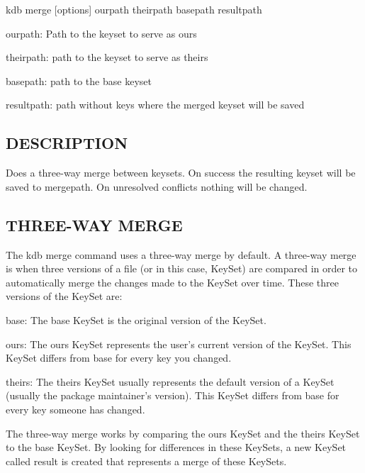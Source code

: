 {\ttfamily kdb merge \mbox{[}options\mbox{]} ourpath theirpath basepath resultpath}


\begin{DoxyItemize}
\item ourpath\+: Path to the keyset to serve as {\ttfamily ours}
\item theirpath\+: path to the keyset to serve as {\ttfamily theirs}
\item basepath\+: path to the {\ttfamily base} keyset
\item resultpath\+: path without keys where the merged keyset will be saved
\end{DoxyItemize}

\subsection*{D\+E\+S\+C\+R\+I\+P\+T\+I\+O\+N}

Does a three-\/way merge between keysets. On success the resulting keyset will be saved to mergepath. On unresolved conflicts nothing will be changed.

\subsection*{T\+H\+R\+E\+E-\/\+W\+A\+Y M\+E\+R\+G\+E}

The {\ttfamily kdb merge} command uses a three-\/way merge by default. A three-\/way merge is when three versions of a file (or in this case, Key\+Set) are compared in order to automatically merge the changes made to the Key\+Set over time. These three versions of the Key\+Set are\+:


\begin{DoxyItemize}
\item {\ttfamily base}\+: The {\ttfamily base} Key\+Set is the original version of the Key\+Set.
\item {\ttfamily ours}\+: The {\ttfamily ours} Key\+Set represents the user's current version of the Key\+Set. This Key\+Set differs from {\ttfamily base} for every key you changed.
\item {\ttfamily theirs}\+: The {\ttfamily theirs} Key\+Set usually represents the default version of a Key\+Set (usually the package maintainer's version). This Key\+Set differs from {\ttfamily base} for every key someone has changed.
\end{DoxyItemize}

The three-\/way merge works by comparing the {\ttfamily ours} Key\+Set and the {\ttfamily theirs} Key\+Set to the {\ttfamily base} Key\+Set. By looking for differences in these Key\+Sets, a new Key\+Set called {\ttfamily result} is created that represents a merge of these Key\+Sets.

